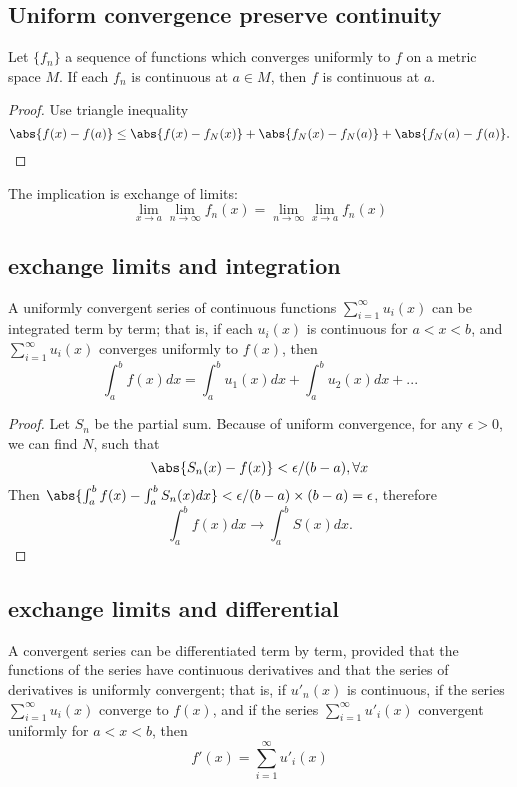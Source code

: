 \begin{refsection}
\subsection{Uniform convergence preserve continuity}
\begin{theorem}
	Let $\{f_n\}$ a sequence of functions which converges uniformly to $f$ on a metric space $M$. If each $f_n$ is continuous at $a\in M$, then $f$ is continuous at $a$.\cite{johnsonbaugh2010foundations}
\end{theorem}
\begin{proof}
	Use triangle inequality $$\abs{f(x)-f(a)}\leq \abs{f(x)-f_N(x)}+\abs{f_N(x)-f_N(a)} + \abs{f_N(a)-f(a)}.$$	
\end{proof}


\begin{remark}
	The implication is exchange of limits:
	$$\lim_{x\to a} \lim_{n\to \infty} f_n(x) = \lim_{n\to \infty} \lim_{x\to a}  f_n(x)$$
\end{remark}


\subsection{exchange limits and integration}
\begin{theorem}
	\cite[421]{kaplan1973advanced}A uniformly convergent series of continuous functions $\sum_{i=1}^\infty u_i(x)$ can be integrated term by term; that is, if each $u_i(x)$ is continuous for $a<x<b$, and $\sum_{i=1}^\infty u_i(x)$ converges uniformly to $f(x)$, then
	$$\int_a^b f(x) dx = \int_a^b u_1(x) dx + \int_a^b u_2(x) dx + ...$$
\end{theorem}
\begin{proof}
	Let $S_n$ be the partial sum. Because of uniform convergence, for any $\epsilon > 0$, we can find $N$, such that
	$$\abs{S_n(x) - f(x)} < \epsilon/(b-a),\forall x$$
	Then $\abs{\int_a^b f(x) - \int_a^b S_n(x) dx} < \epsilon/(b-a)\times(b-a) =\epsilon$, therefore
	$$\int_a^b f(x) dx\to \int_a^b S(x) dx.$$	
\end{proof}


\subsection{exchange limits and differential}
\begin{theorem}
	A convergent series can be differentiated term by term, provided that the functions of the series have continuous derivatives and that the series of derivatives is uniformly convergent; that is, if $u'_n(x)$ is continuous, if the series $\sum_{i=1}^\infty u_i(x)$ converge to $f(x)$, and if the series $\sum_{i=1}^\infty u'_i(x)$ convergent uniformly for $a<x<b$, then
	$$f'(x) = \sum_{i=1}^\infty u'_i(x)$$
\end{theorem}


\end{refsection}
